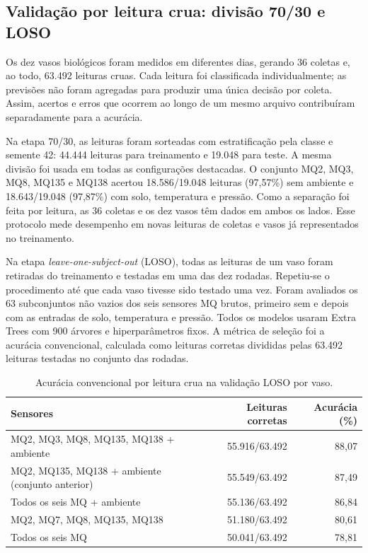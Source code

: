 \subsection{Validação por leitura crua: divisão 70/30 e LOSO}

Os dez vasos biológicos foram medidos em diferentes dias, gerando 36
coletas e, ao todo, 63.492 leituras cruas. Cada leitura foi classificada
individualmente; as previsões não foram agregadas para produzir uma única
decisão por coleta. Assim, acertos e erros que ocorrem ao longo de um mesmo
arquivo contribuíram separadamente para a acurácia.

Na etapa 70/30, as leituras foram sorteadas com estratificação pela classe
e semente 42: 44.444 leituras para treinamento e 19.048 para teste. A mesma
divisão foi usada em todas as configurações destacadas. O conjunto MQ2,
MQ3, MQ8, MQ135 e MQ138 acertou 18.586/19.048 leituras (97,57\%) sem
ambiente e 18.643/19.048 (97,87\%) com solo, temperatura e pressão.
Como a separação foi feita por leitura, as 36 coletas e os dez vasos têm
dados em ambos os lados. Esse protocolo mede desempenho em novas leituras
de coletas e vasos já representados no treinamento.

Na etapa \textit{leave-one-subject-out} (LOSO), todas as leituras de um
vaso foram retiradas do treinamento e testadas em uma das dez rodadas.
Repetiu-se o procedimento até que cada vaso tivesse sido testado uma vez.
Foram avaliados os 63 subconjuntos não vazios dos seis sensores MQ brutos,
primeiro sem e depois com as entradas de solo, temperatura e pressão.
Todos os modelos usaram Extra Trees com 900 árvores e hiperparâmetros fixos.
A métrica de seleção foi a acurácia convencional, calculada como leituras
corretas divididas pelas 63.492 leituras testadas no conjunto das rodadas.

\begin{table}[htbp]
\centering
\small
\caption{Acurácia convencional por leitura crua na validação LOSO por vaso.}
\label{tab:loso_leituras_cruas}
\begin{tabular}{lrr}
\hline
Sensores & Leituras corretas & Acurácia (\%) \\
\hline
MQ2, MQ3, MQ8, MQ135, MQ138 + ambiente & 55.916/63.492 & 88,07 \\
MQ2, MQ135, MQ138 + ambiente (conjunto anterior) & 55.549/63.492 & 87,49 \\
Todos os seis MQ + ambiente & 55.136/63.492 & 86,84 \\
MQ2, MQ7, MQ8, MQ135, MQ138 & 51.180/63.492 & 80,61 \\
Todos os seis MQ & 50.041/63.492 & 78,81 \\
\hline
\end{tabular}
\end{table}

